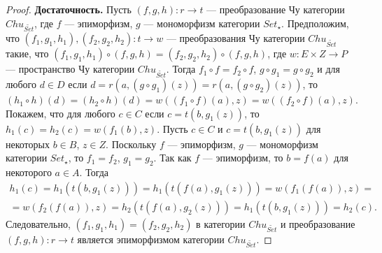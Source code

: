 \documentclass[a4paper,12pt]{article}
\begin{document}
\begin{proof}
    \textbf{Достаточность.} Пусть $(f,g,h): r \to t$ --- преобразование Чу категории $Chu_{\widetilde{Set}}$, где $f$ --- эпиморфизм, $g$ --- мономорфизм категории $Set_{\star}$. Предположим, что $(f_1,g_1,h_1), (f_2,g_2,h_2): t \to w$ --- преобразования Чу категории $Chu_{\widetilde{Set}}$ такие, что $(f_1,g_1,h_1) \circ (f,g,h) = (f_2,g_2,h_2) \circ (f,g,h)$, где $w: E \times Z \to P$ --- пространство Чу категории $Chu_{\widetilde{Set}}$. Тогда $f_1 \circ f = f_2 \circ f$, $g \circ g_1 = g \circ g_2$ и для любого $d \in D$ если $d = r(a,(g \circ g_1)(z)) = r(a,(g \circ g_2)(z))$, то $(h_1 \circ h)(d) = (h_2 \circ h)(d) = w((f_1 \circ f)(a), z) = w((f_2 \circ f)(a), z)$. Покажем, что для любого $c \in C$ если $c = t(b,g_1(z))$, то $h_1(c) = h_2(c) = w(f_1(b),z)$. Пусть $c \in C$ и $c = t(b,g_1(z))$ для некоторых $b \in B$, $z \in Z$. Поскольку $f$ --- эпиморфизм, $g$ --- мономорфизм категории $Set_{\star}$, то $f_1 = f_2$, $g_1 = g_2$. Так как $f$ --- эпиморфизм, то $b = f(a)$ для некоторого $a \in A$. Тогда 
    \begin{multline*}
        h_1(c) = h_1(t(b,g_1(z))) = h_1(t(f(a),g_1(z))) = w(f_1(f(a)),z) =\\=
        w(f_2(f(a)),z) = h_2(t(f(a),g_2(z))) = h_1(t(b,g_1(z))) = h_2(c).
    \end{multline*}
    Следовательно, $(f_1,g_1,h_1) = (f_2,g_2,h_2)$ в категории $Chu_{\widetilde{Set}}$ и преобразование $(f,g,h): r \to t$ является эпиморфизмом категории $Chu_{\widetilde{Set}}$.
\end{proof}
\end{document}
